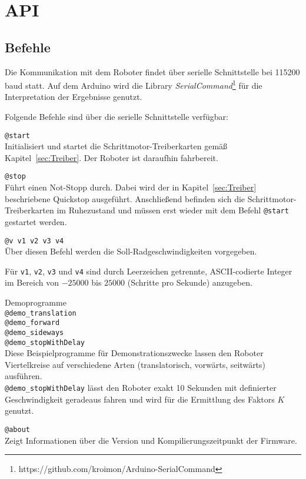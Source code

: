 
\section{API}
\subsection{Befehle}
Die Kommunikation mit dem Roboter findet über serielle Schnittstelle bei 115200 baud statt.
Auf dem Arduino wird die Library \emph{SerialCommand}\footnote{https://github.com/kroimon/Arduino-SerialCommand} für die Interpretation der Ergebnisse genutzt.

Folgende Befehle sind über die serielle Schnittstelle verfügbar:
\begin{description}
\item \lstinline{@start} \\
Initialisiert und startet die Schrittmotor-Treiberkarten gemäß Kapitel~\ref{sec:Treiber}.
Der Roboter ist daraufhin fahrbereit.

\item \lstinline{@stop} \\
Führt einen Not-Stopp durch. Dabei wird der in Kapitel~\ref{sec:Treiber} beschriebene Quickstop ausgeführt.
Anschließend befinden sich die Schrittmotor-Treiberkarten im Ruhezustand und müssen erst wieder mit dem Befehl \lstinline{@start} gestartet werden.

\item \lstinline{@v v1 v2 v3 v4}\\
Über diesen Befehl werden die Soll-Radgeschwindigkeiten vorgegeben.

Für \lstinline{v1}, \lstinline{v2}, \lstinline{v3} und \lstinline{v4} sind durch Leerzeichen getrennte, ASCII-codierte Integer im Bereich von $-25000$ bis $25000$ (Schritte pro Sekunde) anzugeben.

\item Demoprogramme\\
    \lstinline{@demo_translation}\\
    \lstinline{@demo_forward}\\
    \lstinline{@demo_sideways}\\
    \lstinline{@demo_stopWithDelay}\\
Diese Beispielprogramme für Demonstrationszwecke lassen den Roboter Viertelkreise auf verschiedene Arten (translatorisch, vorwärts, seitwärts) ausführen.\\
\lstinline{@demo_stopWithDelay} lässt den Roboter exakt 10 Sekunden mit definierter Geschwindigkeit geradeaus fahren und wird für die Ermittlung des Faktors $K$ genutzt.

\item \lstinline{@about} \\
Zeigt Informationen über die Version und Kompilierungszeitpunkt der Firmware.
\end{description}


